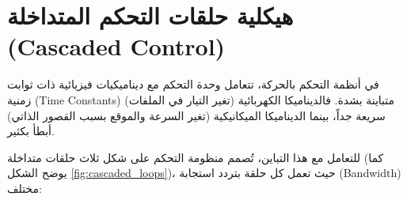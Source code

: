 \section{هيكلية حلقات التحكم المتداخلة (\textenglish{Cascaded Control})}
\label{sec:cascaded_loops}

في أنظمة التحكم بالحركة، تتعامل وحدة التحكم مع ديناميكيات فيزيائية ذات ثوابت زمنية (\textenglish{Time Constants}) متباينة بشدة. فالديناميكا الكهربائية (تغير التيار في الملفات) سريعة جداً، بينما الديناميكا الميكانيكية (تغير السرعة والموقع بسبب القصور الذاتي) أبطأ بكثير. 

للتعامل مع هذا التباين، تُصمم منظومة التحكم على شكل ثلاث حلقات متداخلة (كما يوضح الشكل \ref{fig:cascaded_loops})، حيث تعمل كل حلقة بتردد استجابة (\textenglish{Bandwidth}) مختلف:


